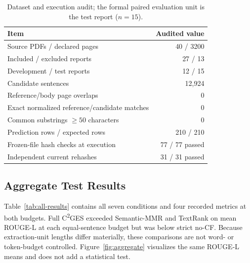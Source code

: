\documentclass[applsci,article,submit,moreauthors]{Definitions/mdpi}
\newcommand{\cges}{C\textsuperscript{2}GES}
\begin{document}
\begin{table}[H]
\caption{Dataset and execution audit; the formal paired evaluation unit is the test report ($n=15$).}
\label{tab:audit}\centering
\begin{tabular}{lr}
\toprule
Item & Audited value\\
\midrule
Source PDFs / declared pages & 40 / 3200\\
Included / excluded reports & 27 / 13\\
Development / test reports & 12 / 15\\
Candidate sentences & 12,924\\
Reference/body page overlaps & 0\\
Exact normalized reference/candidate matches & 0\\
Common substrings $\geq50$ characters & 0\\
Prediction rows / expected rows & 210 / 210\\
Frozen-file hash checks at execution & 77 / 77 passed\\
Independent current rehashes & 31 / 31 passed\\
\bottomrule
\end{tabular}
\end{table}

\subsection{Aggregate Test Results}

Table~\ref{tab:all-results} contains all seven conditions and four recorded metrics at both budgets. Full \cges{} exceeded Semantic-MMR and TextRank on mean ROUGE-L at each equal-sentence budget but was below strict no-CF. Because extraction-unit lengths differ materially, these comparisons are not word- or token-budget controlled. Figure~\ref{fig:aggregate} visualizes the same ROUGE-L means and does not add a statistical test.
\end{document}

